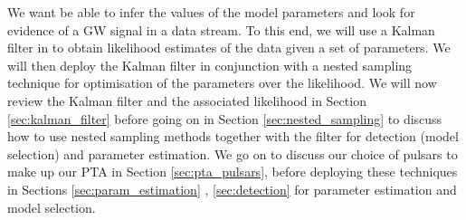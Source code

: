\documentclass[fleqn,usenatbib,useAMS]{mnras}
\begin{document}
\noindent We want be able to infer the values of the model parameters and look for evidence of a GW signal in a data stream. To this end, we will use a Kalman filter in to obtain likelihood estimates of the data given a set of parameters. We will then deploy the Kalman filter in conjunction with a nested sampling technique for optimisation of the parameters over the likelihood. We will now review the Kalman filter and the associated likelihood in Section \ref{sec:kalman_filter} before going on in Section \ref{sec:nested_sampling} to discuss how to use nested sampling methods together with the filter for detection (model selection) and parameter estimation. We go on to discuss our choice of pulsars to make up our PTA in Section \ref{sec:pta_pulsars}, before deploying these techniques in Sections \ref{sec:param_estimation} , \ref{sec:detection} for parameter estimation and model selection.
\end{document}
